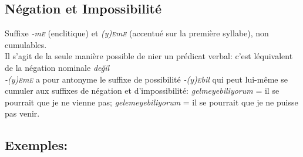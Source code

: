 \documentclass{cours}
\newcommand{\ug}{\u{g}}
\newcommand{\sce}{\textsc{e}}
\begin{document}
\subsection{Négation et Impossibilité}
Suffixe \textsl{-m\sce} (enclitique) et \textsl{(y)\sce m\sce} (accentué sur la première syllabe), non cumulables.\\
Il s'agit de la seule manière possible de nier un prédicat verbal: c'est léquivalent de la négation nominale {\sl de\ug il}\\
\textsl{-(y)\sce m\sce} a pour antonyme le suffixe de possibilité \textsl{-(y)\sce bil} qui peut lui-même se cumuler aux suffixes de négation et d'impossibilité: \textsl{gelmeyebiliyorum} = il se pourrait que je ne vienne pas; \textsl{gelemeyebiliyorum} = il se pourrait que je ne puisse pas venir.

\subsection{Exemples:}
\end{document}
